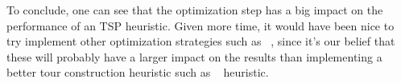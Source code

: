 To conclude, one can see that the optimization step has a big impact on the
performance of an TSP heuristic. Given more time, it would have been nice to
try implement other optimization strategies such as
~\cite{wikipedia:lin}, 
since it's our belief that these will probably have a
larger impact on the results than implementing a better tour construction
heuristic such as ~\cite{wikipedia:christofides} heuristic.
